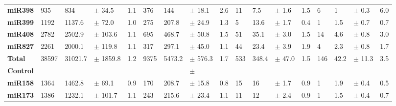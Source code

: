 \begin{landscape}
\begin{table}[]
\begin{tabular}{lllllllllllllllll}
\textbf{miR398}      & 935            & 834               & $\pm$  34.5      & 1.1            & 376            & 144               & $\pm$  18.1      & 2.6            & 11             & 7.5               & $\pm$  1.6       & 1.5            & 6              & 1                 & $\pm$  0.3       & 6.0            \\
\textbf{miR399}      & 1192           & 1137.6            & $\pm$  72.0      & 1.0            & 275            & 207.8             & $\pm$  24.9      & 1.3            & 5              & 13.6              & $\pm$  1.7       & 0.4            & 1              & 1.5               & $\pm$  0.7       & 0.7            \\
\textbf{miR408}      & 2782           & 2502.9            & $\pm$  103.6     & 1.1            & 695            & 468.7             & $\pm$  50.8      & 1.5            & 51             & 35.1              & $\pm$  3.0       & 1.5            & 14             & 4.6               & $\pm$  0.8       & 3.0            \\
\textbf{miR827}      & 2261           & 2000.1            & $\pm$  119.8     & 1.1            & 317            & 297.1             & $\pm$  45.0      & 1.1            & 44             & 23.4              & $\pm$  3.9       & 1.9            & 4              & 2.3               & $\pm$  0.8       & 1.7            \\
\textbf{Total}       & 38597          & 31021.7           & $\pm$  1859.8    & 1.2            & 9375           & 5473.2            & $\pm$  576.3     & 1.7            & 533            & 348.4             & $\pm$  47.0      & 1.5            & 146            & 42.2              & $\pm$  11.3      & 3.5            \\
\textbf{Control}     &                &                   &                  &                &                &                   & $\pm$            &                &                &                   &                  &                &                &                   &                  &                \\
\textbf{miR158}      & 1364           & 1462.8            & $\pm$  69.1      & 0.9            & 170            & 208.7             & $\pm$  15.8      & 0.8            & 15             & 16                & $\pm$  1.7       & 0.9            & 1              & 1.9               & $\pm$  0.4       & 0.5            \\
\textbf{miR173}      & 1386           & 1232.1            & $\pm$  101.7     & 1.1            & 243            & 215.6             & $\pm$  23.4      & 1.1            & 11             & 12                & $\pm$  2.4       & 0.9            & 1              & 1.5               & $\pm$  0.4       & 0.7           \\

\end{tabular}
\end{table}
\end{landscape}
